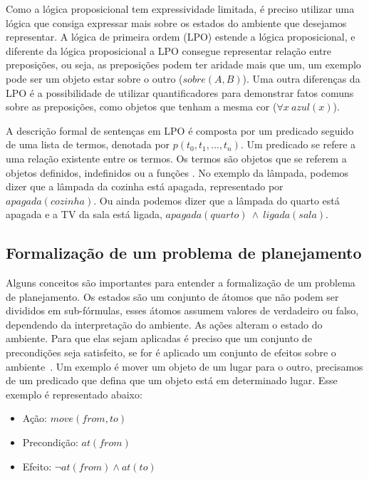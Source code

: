 Como a lógica proposicional tem expressividade limitada, é preciso utilizar uma lógica que consiga expressar mais sobre os estados do ambiente que desejamos representar. 
A lógica de primeira ordem (LPO) estende a lógica proposicional, e diferente da lógica proposicional a LPO consegue representar relação entre preposições, ou seja, as preposições podem ter aridade mais que um, um exemplo pode ser um objeto estar sobre o outro ($sobre(A,B)$). Uma outra diferenças da LPO é a possibilidade de utilizar quantificadores para demonstrar fatos comuns sobre as preposições, como objetos que tenham a mesma cor ($\forall x~ azul(x)$).

A descrição formal de sentenças em LPO é composta por um predicado seguido de uma lista de termos, denotada por $p(t_{0}, t_{1}, ..., t_{n})$. 
Um predicado se refere a uma relação existente entre os termos. 
Os termos são objetos que se referem a objetos definidos, indefinidos ou a funções \cite[Capítulo 10]{intelligence2003modern}. 
No exemplo da lâmpada, podemos dizer que a lâmpada da cozinha está apagada, representado por $apagada(cozinha)$. 
Ou ainda podemos dizer que a lâmpada do quarto está apagada e a TV da sala está ligada, $apagada(quarto)~ \wedge~ ligada(sala)$.  

\subsection{Formalização de um problema de planejamento}

Alguns conceitos são importantes para entender a formalização de um problema de planejamento. 
Os estados são um conjunto de átomos que não podem ser divididos em sub-fórmulas, esses átomos assumem valores de verdadeiro ou falso, dependendo da interpretação do ambiente.
As ações alteram o estado do ambiente. Para que elas sejam aplicadas é preciso que um conjunto de precondições seja satisfeito, se for é aplicado um conjunto de efeitos sobre o ambiente~\cite[Capítulo 10]{intelligence2003modern}.
Um exemplo é mover um objeto de um lugar para o outro, precisamos de um predicado que defina que um objeto está em determinado lugar. Esse exemplo é representado abaixo:

\begin{itemize}
	\item Ação: $move(from, to)$
	\item Precondição: $at(from)$
	\item Efeito: $\neg at(from) \wedge at(to)$
\end{itemize}

